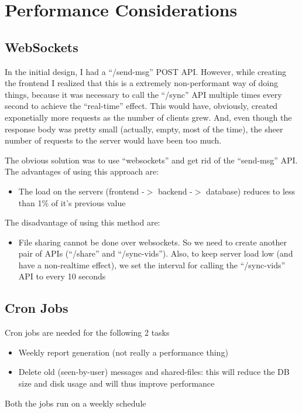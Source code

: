 \documentclass[a4paper, 10pt]{article}
\begin{document}
\section{Performance Considerations}
\subsection{WebSockets}
In the initial design, I had a ``/send-msg'' POST API. However, while creating the frontend I realized that this is a extremely non-performant way of doing things, because it was necessary to call the ``/sync'' API multiple times every second to achieve the ``real-time'' effect. This would have, obviously, created exponetially more requests as the number of clients grew. And, even though the response body was pretty small (actually, empty, most of the time), the sheer number of requests to the server would have been too much.

The obvious solution was to use ``websockets'' and get rid of the ``send-msg'' API. The advantages of using this approach are:

\begin{itemize}
  \item The load on the servers (frontend -$>$ backend -$>$ database) reduces to less than 1\% of it's previous value
\end{itemize}

The disadvantage of using this method are:

\begin{itemize}
  \item File sharing cannot be done over websockets. So we need to create another pair of APIs (``/share'' and ``/sync-vids''). Also, to keep server load low (and have a non-realtime effect), we set the interval for calling the ``/sync-vids'' API to every 10 seconds
\end{itemize}

\subsection{Cron Jobs}
Cron jobs are needed for the following 2 tasks
\begin{itemize}
  \item Weekly report generation (not really a performance thing)
  \item Delete old (seen-by-user) messages and shared-files: this will reduce the DB size and disk usage and will thus improve performance
\end{itemize}
Both the jobs run on a weekly schedule
\end{document}
